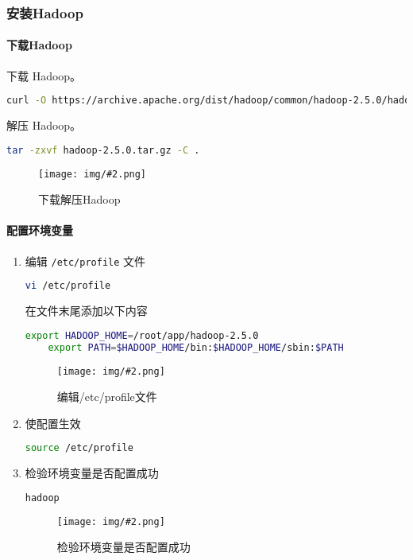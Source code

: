 \documentclass{article}
\newenvironment{enum}{
    \begin{enumerate}[label=(\arabic*), noitemsep]
}{
    \end{enumerate}
}
\newcommand{\img}[3][0.9]{%
    \begin{figure}[H]
        \centering
        \texttt{[image: img/\#2.png]}
        \caption{#3}
    \end{figure}
}
\newcommand{\subsubsubsection}[1]{\paragraph{#1}\mbox{}}
\begin{document}
\subsubsection{安装Hadoop}

\subsubsubsection{下载Hadoop}

下载 Hadoop。

\begin{lstlisting}[language=bash]
    curl -O https://archive.apache.org/dist/hadoop/common/hadoop-2.5.0/hadoop-2.5.0.tar.gz
\end{lstlisting}

解压 Hadoop。

\begin{lstlisting}[language=bash]
    tar -zxvf hadoop-2.5.0.tar.gz -C .
\end{lstlisting}

\img{2.3.1.1}{下载解压Hadoop}

\subsubsubsection{配置环境变量}

\label{subsubsubsection:config-hadoop-env}

\begin{enum}
    \item 编辑 \texttt{/etc/profile} 文件
    
    \begin{lstlisting}[language=bash]
    vi /etc/profile
    \end{lstlisting}

    在文件末尾添加以下内容 

    \begin{lstlisting}[language=bash]
    export HADOOP_HOME=/root/app/hadoop-2.5.0
    export PATH=$HADOOP_HOME/bin:$HADOOP_HOME/sbin:$PATH
    \end{lstlisting}

    \img[0.65]{2.3.2.1}{编辑/etc/profile文件}

    \item 使配置生效
    
    \begin{lstlisting}[language=bash]
    source /etc/profile
    \end{lstlisting}

    \item 检验环境变量是否配置成功
    
    \begin{lstlisting}[language=bash]
    hadoop
    \end{lstlisting}

    \img[0.8]{2.3.2.2}{检验环境变量是否配置成功}
\end{enum}
\end{document}
